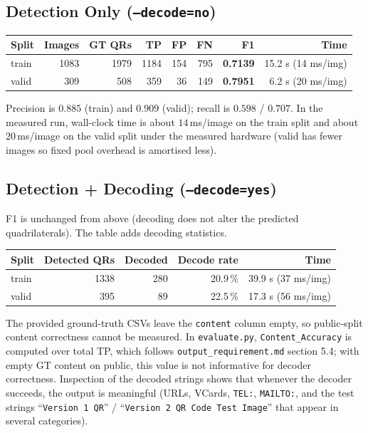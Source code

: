 \documentclass[11pt,a4paper]{article}
\begin{document}
\subsection{Detection Only (\texttt{---decode=no})}

\begin{center}
\begin{tabular}{@{}lrrrrrrr@{}}
\toprule
Split & Images & GT QRs & TP & FP & FN & F1 & Time \\
\midrule
train & 1083 & 1979 & 1184 & 154 & 795 & \textbf{0.7139} &
        15.2 s (14 ms/img) \\
valid &  309 &  508 &  359 &  36 & 149 & \textbf{0.7951} &
         6.2 s (20 ms/img) \\
\bottomrule
\end{tabular}
\end{center}

Precision is $0.885$ (train) and $0.909$ (valid); recall is
$0.598$ / $0.707$. In the measured run, wall-clock time is about
$14$\,ms/image on the train split and about $20$\,ms/image on the valid split under the measured
hardware (valid has fewer images so fixed pool overhead is amortised less).

\subsection{Detection + Decoding (\texttt{---decode=yes})}

F1 is unchanged from above (decoding does not alter the predicted
quadrilaterals). The table adds decoding statistics.

\begin{center}
\begin{tabular}{@{}lrrrr@{}}
\toprule
Split & Detected QRs & Decoded & Decode rate & Time \\
\midrule
train & 1338 & 280 & 20.9\,\% & 39.9 s (37 ms/img) \\
valid &  395 &  89 & 22.5\,\% & 17.3 s (56 ms/img) \\
\bottomrule
\end{tabular}
\end{center}

The provided ground-truth CSVs leave the \texttt{content} column empty,
so public-split content correctness cannot be measured. In
\texttt{evaluate.py}, \texttt{Content\_Accuracy} is computed over total TP,
which follows \texttt{output\_requirement.md} section 5.4; with empty GT
content on public, this value is not informative for decoder correctness.
Inspection of the decoded strings shows that whenever the
decoder succeeds, the output is meaningful (URLs, VCards, \texttt{TEL:},
\texttt{MAILTO:}, and the test strings ``\texttt{Version 1 QR}'' /
``\texttt{Version 2 QR Code Test Image}'' that appear in several
categories).
\end{document}
